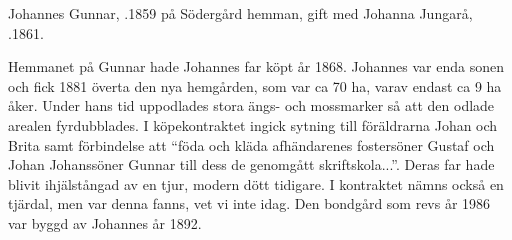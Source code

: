 %
Johannes Gunnar, .1859 på Södergård hemman, gift med Johanna Jungarå, .1861.
\begin{jhchildren}
  \item {}
  \item {}
  \item {}
  \item {}
  \item {}
  \item {}
  \item {}
  \item {}
  \item {}
  \item {}
  \item {}
  \item {}
\end{jhchildren}

Hemmanet på Gunnar hade Johannes far köpt år 1868. Johannes var enda sonen och fick 1881 överta den nya hemgården, som var ca 70 ha, varav endast ca 9 ha åker. Under hans tid uppodlades stora ängs- och mossmarker så att den odlade arealen fyrdubblades. I köpekontraktet ingick sytning till föräldrarna Johan och Brita samt förbindelse att ``föda och kläda afhändarenes fostersöner Gustaf och Johan Johanssöner Gunnar till dess de genomgått skriftskola...''. Deras far hade blivit ihjälstångad av en tjur, modern dött tidigare. I kontraktet nämns också en tjärdal, men var denna fanns, vet vi inte idag. Den bondgård som revs år 1986 var byggd av Johannes år 1892.

